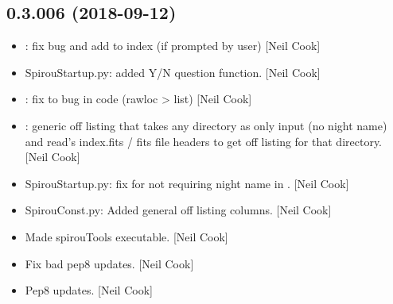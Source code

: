\documentclass[a4paper,10pt,english]{report}
\begin{document}
\subsection{0.3.006 (2018-09-12)}
\label{\detokenize{misc/changelog:id327}}\begin{itemize}
\item {} 
: fix bug and add to index (if prompted by user) {[}Neil
Cook{]}

\item {} 
SpirouStartup.py: added Y/N question function. {[}Neil Cook{]}

\item {} 
: fix to bug in code (rawloc \textendash{}\textgreater{} list) {[}Neil Cook{]}

\item {} 
: generic off listing that takes any directory as only
input (no night name) and read’s index.fits /  fits file headers to
get off listing for that directory. {[}Neil Cook{]}

\item {} 
SpirouStartup.py: fix for not requiring night name in .
{[}Neil Cook{]}

\item {} 
SpirouConst.py: Added general off listing columns. {[}Neil Cook{]}

\item {} 
Made spirouTools executable. {[}Neil Cook{]}

\item {} 
Fix bad pep8 updates. {[}Neil Cook{]}

\item {} 
Pep8 updates. {[}Neil Cook{]}

\end{itemize}
\end{document}
